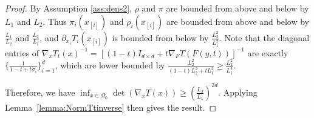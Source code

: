 \begin{proof}
By Assumption \ref{ass:dens2}, $\rho$ and $\pi$ are bounded from above
and below by $L_1$ and $L_2$. %
Thus $\pi_i(x_{[i]})$ and
$\rho_i(x_{[i]})$ are bounded from above and below by
$\frac{L_1}{L_2}$ and $\frac{L_2}{L_1}$, %
and $\partial_{x_i}T_i(x_{[i]})$ is bounded from below by
$\frac{L_2^2}{L_1^2}$. Note that the diagonal entries of
$\nabla_x T_t(x)^{-1} = [(1-t)I_{d\times d} + t\nabla_F
T(F(y,t))]^{-1}$ are exactly $\{\frac{1}{1-t + t\sigma_i}\}_{i=1}^d$,
which are lower bounded by
$\frac{L_2^2}{(1-t)L_2^2 + tL_1^2} \geq \frac{L_2^2}{L_1^2}$.

Therefore, we have
$\inf_{x\in\Omega_0}\det (\nabla_x T(x)) \geq
\left(\frac{L_2}{L_1}\right)^{2d}$. Applying
 Lemma~\ref{lemma:NormTtinverse} then gives the result.
\end{proof}



